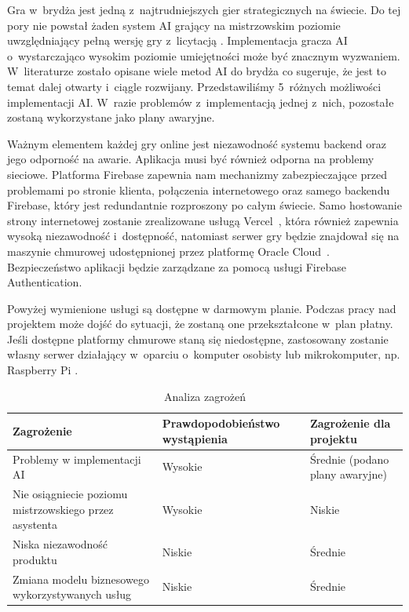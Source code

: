 Gra w~brydża jest jedną z~najtrudniejszych gier strategicznych na świecie.
Do tej pory nie powstał żaden system AI grający na mistrzowskim poziomie
uwzględniający pełną wersję gry z~licytacją \cite{Bethe2021AdvancesIC}.
Implementacja gracza AI o~wystarczająco wysokim poziomie umiejętności może
być znacznym wyzwaniem. W~literaturze zostało opisane wiele metod AI do brydża
\cite{Zhang2019DesignAD,Zhang2022TheSO,Zhang2022AIEB,Ginsberg1999GIBST}
co sugeruje, że jest to temat dalej otwarty i~ciągle rozwijany.
Przedstawiliśmy 5~różnych możliwości implementacji AI.
W~razie problemów z~implementacją jednej z~nich, pozostałe
zostaną wykorzystane jako plany awaryjne.

Ważnym elementem każdej gry online jest niezawodność systemu
backend oraz jego odporność na awarie.
Aplikacja musi być również odporna na problemy sieciowe.
Platforma Firebase zapewnia nam mechanizmy zabezpieczające
przed problemami po stronie klienta, połączenia internetowego
oraz samego backendu Firebase, który jest redundantnie
rozproszony po całym świecie.
Samo hostowanie strony internetowej zostanie zrealizowane
usługą Vercel~\cite{Vercel}, która również zapewnia wysoką
niezawodność i~dostępność, natomiast serwer gry będzie znajdował
się na maszynie chmurowej udostępnionej przez platformę Oracle Cloud~\cite{OracleCloud}.
Bezpieczeństwo aplikacji będzie zarządzane za pomocą
usługi Firebase Authentication.

Powyżej wymienione usługi są dostępne w darmowym planie.
Podczas pracy nad projektem może dojść do sytuacji, że
zostaną one przekształcone w~plan płatny.
Jeśli dostępne platformy chmurowe staną się niedostępne,
zastosowany zostanie własny serwer działający
w~oparciu o~komputer osobisty lub mikrokomputer, np. Raspberry Pi \cite{RPi}.

\begin{table}[h]
    \centering
    \begin{tabularx}{\textwidth}{|p{5.5cm}|Y|Y|}
        \hline
        \textbf{Zagrożenie}                                    & \textbf{Prawdopodobieństwo wystąpienia} & \textbf{Zagrożenie dla projektu} \tabularnewline[0.2cm]
        \hline
        Problemy w implementacji AI                            & Wysokie                                 & Średnie (podano plany awaryjne)  \tabularnewline[0.2cm]
        Nie osiągniecie poziomu mistrzowskiego przez asystenta & Wysokie                                 & Niskie                           \tabularnewline[0.3cm]
        Niska niezawodność produktu                            & Niskie                                  & Średnie                          \tabularnewline[0.1cm]
        Zmiana modelu biznesowego wykorzystywanych usług       & Niskie                                  & Średnie                          \tabularnewline[0.1cm]
        \hline
    \end{tabularx}
    \caption{Analiza zagrożeń}
    \label{tab:zagrozenia}
\end{table}

